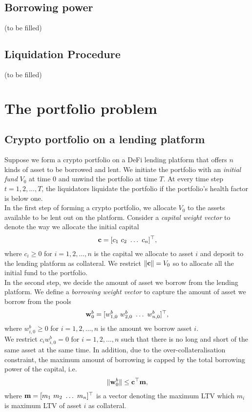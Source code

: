 \documentclass{article} %
\theoremstyle{plain}
\theoremstyle{definition} %
\begin{document}
\subsection{Borrowing power}
(to be filled)
\subsection{Liquidation Procedure}
(to be filled)


\section{The portfolio problem}
\subsection{Crypto portfolio on a lending platform}
Suppose we form a crypto portfolio on a DeFi lending platform that offers $n$ kinds of asset to be borrowed and lent. 
 We initiate the portfolio with an \textit{initial fund} $V_0$ at time $0$ and unwind the portfolio at time $T$.
 At every time step $t=1,2,...,T$, the liquidators liquidate the portfolio if the portfolio's health factor is below one.\\

In the first step of forming a crypto portfolio, we allocate $V_0$ to the assets available to be lent out on the platform. 
Consider a \textit{capital weight vector} to denote the way we allocate the initial capital
\begin{align*}
  {\bf c} = [c_1\ c_2\ \dots\ c_n]^\top,
\end{align*}
where $c_i \geq 0$ for $i=1,2,\dots,n$ is the capital we allocate to asset $i$ and deposit to the lending platform as collateral.
We restrict $\|{\bf c}\| = V_0$ so to allocate all the initial fund to the portfolio. \\

In the second step, we decide the amount of asset we borrow from the lending platform.
We define a \textit{borrowing weight vector} to capture the amount of asset we borrow from the pools
\begin{align*}
  {\bf w}^b_0 = [w_{1,0}^b\ w_{2,0}^b\ \dots\ w^b_{n,0}]^\top,
\end{align*}
where $w^b_{i,0} \geq 0$ for $i=1,2,\dots,n$ is the amount we borrow asset $i$. \\ 

We restrict $c_iw^b_{i,0} = 0$ for $i=1,2,\dots,n$ such that there is no long and short of the same asset at the same time.
In addition, due to the over-collateralisation constraint, the maximum amount of borrowing is capped by the total borrowing power of the capital, i.e.
 \begin{align*}
  \|{\bf w}^b_0\| \leq {\bf c}^\top {\bf m},
  \end{align*}
where ${\bf m} = [m_1\ m_2\ \dots\ m_n]^\top$ is a vector denoting the maximum LTV which $m_i$ is maximum LTV of asset $i$ as collateral. \\
\end{document}
